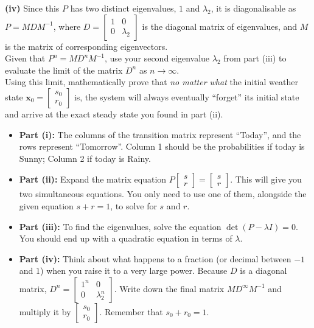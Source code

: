 \begin{problem}
\textbf{(iv)} Since this $P$ has two distinct eigenvalues, $1$ and $\lambda_2$, it is diagonalisable as $P = M D M^{-1}$, where $D = \begin{bmatrix} 1 & 0 \\ 0 & \lambda_2 \end{bmatrix}$ is the diagonal matrix of eigenvalues, and $M$ is the matrix of corresponding eigenvectors.\\
Given that $P^n = M D^n M^{-1}$, use your second eigenvalue $\lambda_2$ from part (iii) to evaluate the limit of the matrix $D^n$ as $n \to \infty$. \\
Using this limit, mathematically prove that \textit{no matter what} the initial weather state $\mathbf{x}_0 = \begin{bmatrix} s_0 \\ r_0 \end{bmatrix}$ is, the system will always eventually ``forget'' its initial state and arrive at the exact steady state you found in part (ii). 
\end{problem}

\begin{hint}
\begin{itemize}
    \item \textbf{Part (i):} The columns of the transition matrix represent ``Today'', and the rows represent ``Tomorrow''. Column 1 should be the probabilities if today is Sunny; Column 2 if today is Rainy. 
    \item \textbf{Part (ii):} Expand the matrix equation $P \begin{bmatrix} s \\ r \end{bmatrix} = \begin{bmatrix} s \\ r \end{bmatrix}$. This will give you two simultaneous equations. You only need to use one of them, alongside the given equation $s + r = 1$, to solve for $s$ and $r$.
    \item \textbf{Part (iii):} To find the eigenvalues, solve the equation $\det(P - \lambda I) = 0$. You should end up with a quadratic equation in terms of $\lambda$.
    \item \textbf{Part (iv):} Think about what happens to a fraction (or decimal between $-1$ and $1$) when you raise it to a very large power. Because $D$ is a diagonal matrix, $D^n = \begin{bmatrix} 1^n & 0 \\ 0 & \lambda_2^n \end{bmatrix}$. Write down the final matrix $M D^\infty M^{-1}$ and multiply it by $\begin{bmatrix} s_0 \\ r_0 \end{bmatrix}$. Remember that $s_0 + r_0 = 1$.
\end{itemize}
\end{hint}

